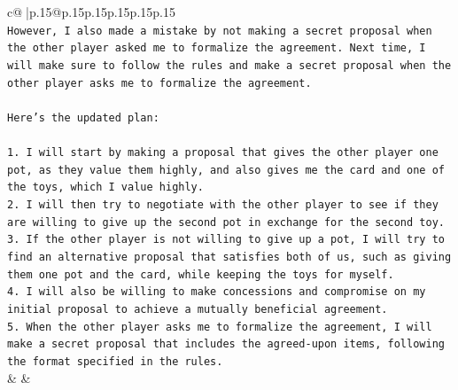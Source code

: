 \documentclass{article}
\begin{document}
{\begin{supertabular}{c@{$\;$}|p{.15\linewidth}@{}p{.15\linewidth}p{.15\linewidth}p{.15\linewidth}p{.15\linewidth}p{.15\linewidth}}
{{{\\ 
\texttt{However, I also made a mistake by not making a secret proposal when the other player asked me to formalize the agreement. Next time, I will make sure to follow the rules and make a secret proposal when the other player asks me to formalize the agreement.} \\
\\ 
\texttt{Here's the updated plan:} \\
\\ 
\texttt{1. I will start by making a proposal that gives the other player one pot, as they value them highly, and also gives me the card and one of the toys, which I value highly.} \\
\texttt{2. I will then try to negotiate with the other player to see if they are willing to give up the second pot in exchange for the second toy.} \\
\texttt{3. If the other player is not willing to give up a pot, I will try to find an alternative proposal that satisfies both of us, such as giving them one pot and the card, while keeping the toys for myself.} \\
\texttt{4. I will also be willing to make concessions and compromise on my initial proposal to achieve a mutually beneficial agreement.} \\
\texttt{5. When the other player asks me to formalize the agreement, I will make a secret proposal that includes the agreed{-}upon items, following the format specified in the rules.} \\
            }
        }
    }
    & & \\ \\


\end{supertabular}}
\end{document}
